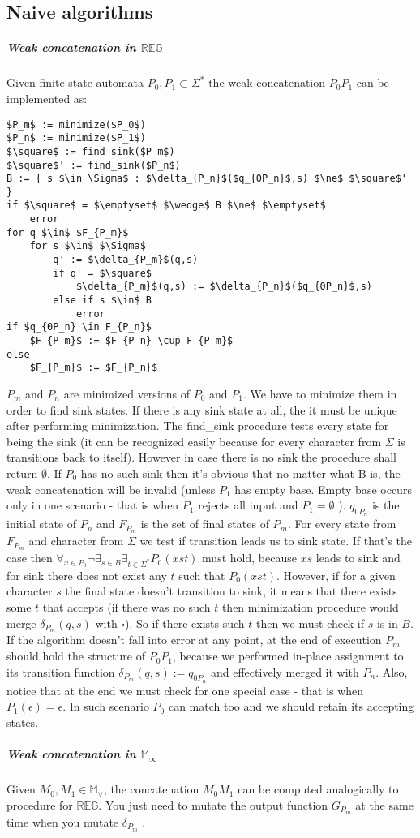 \documentclass[12pt]{article}
\begin{document}
\subsection{Naive algorithms}
\subparagraph{Weak concatenation in $\mathbb{REG}$}
Given finite state automata $P_0,P_1 \subset \Sigma^*$ the weak concatenation $P_0P_1 $ can be implemented as:
\begin{lstlisting}
$P_m$ := minimize($P_0$)
$P_n$ := minimize($P_1$)
$\square$ := find_sink($P_m$)
$\square$' := find_sink($P_n$)
B := { s $\in \Sigma$ : $\delta_{P_n}$($q_{0P_n}$,s) $\ne$ $\square$' }
if $\square$ = $\emptyset$ $\wedge$ B $\ne$ $\emptyset$
    error
for q $\in$ $F_{P_m}$ 
    for s $\in$ $\Sigma$
        q' := $\delta_{P_m}$(q,s)
        if q' = $\square$ 
            $\delta_{P_m}$(q,s) := $\delta_{P_n}$($q_{0P_n}$,s) 
        else if s $\in$ B
            error
if $q_{0P_n} \in F_{P_n}$            
    $F_{P_m}$ := $F_{P_n} \cup F_{P_m}$
else 
    $F_{P_m}$ := $F_{P_n}$
\end{lstlisting}
$P_m$ and $P_n$ are minimized versions of $P_0$ and $P_1$. We have to minimize them in order to find sink states.  If there is any sink state at all, the it must be unique after performing minimization. The find\_sink procedure tests every state for being the sink (it can be recognized easily because for every character from $\Sigma$ is transitions back to itself). However in case there is no sink the procedure shall return $\emptyset$. If $P_0$ has no such sink then it's obvious that no matter what B is, the weak concatenation will be invalid (unless  $P_1$ has empty base. Empty base occurs only in one scenario - that is when $P_1$ rejects all input and $P_1 = \emptyset$ ). $q_{0P_n}$ is the initial state of $P_n$ and $F_{P_m}$ is the set of final states of $P_m$. For every state from $F_{P_m}$ and character from $\Sigma$ we test if transition leads us to sink state. If that's the case then $\forall_{x\in P_0} \neg \exists_{s\in B} \exists_{t\in\Sigma^*} P_0(xst)$ must hold, because $xs$ leads to sink and for sink there does not exist any $t$ such that $ P_0(xst)$. However, if for a given  character $s$ the final state doesn't transition to sink, it means that there exists some $t$ that accepts (if there was no such $t$ then minimization procedure would merge $\delta_{P_m}(q,s)$ with $\square$). So if there exists such $t$ then we must check if $s$ is in $B$. If the algorithm doesn't fall into error at any point, at the end of execution $P_m$ should hold the structure of $P_0P_1$, because we performed in-place assignment to its transition function $\delta_{P_m}(q,s) := q_{0P_n}$ and effectively merged it with $P_n$.
Also, notice that at the end we must check for one special case - that is when $P_1(\epsilon)=\epsilon$. In such scenario $P_0$ can match too and we should retain its accepting states.
\subparagraph{Weak concatenation in $\mathbb{M}_\infty$} Given $M_0,M_1 \in \mathbb{M}_\vee$, the concatenation $M_0M_1$ can be computed analogically to procedure for $\mathbb{ REG}$. You just need to mutate the output function $G_{P_m}$ at the same time when you mutate $\delta_{P_m}$ . 
\end{document}
